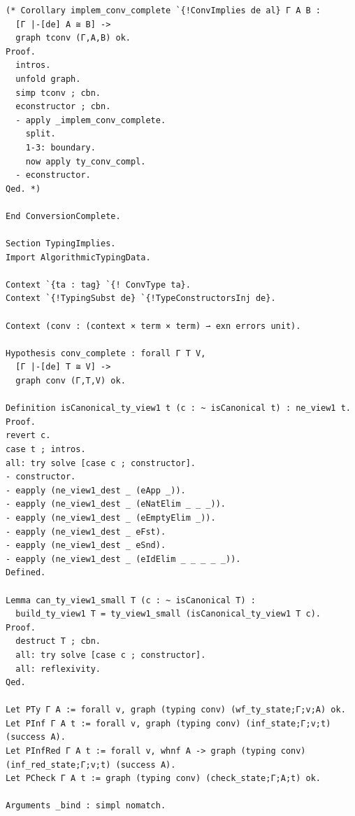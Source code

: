 \documentclass[10pt,a4paper]{amsart}
\begin{document}
\begin{lstlisting}
(* Corollary implem_conv_complete `{!ConvImplies de al} Γ A B :
  [Γ |-[de] A ≅ B] ->
  graph tconv (Γ,A,B) ok.
Proof.
  intros.
  unfold graph.
  simp tconv ; cbn.
  econstructor ; cbn.
  - apply _implem_conv_complete.
    split.
    1-3: boundary.
    now apply ty_conv_compl.
  - econstructor.
Qed. *)

End ConversionComplete.

Section TypingImplies.
Import AlgorithmicTypingData.

Context `{ta : tag} `{! ConvType ta}.
Context `{!TypingSubst de} `{!TypeConstructorsInj de}.

Context (conv : (context × term × term) ⇀ exn errors unit).

Hypothesis conv_complete : forall Γ T V,
  [Γ |-[de] T ≅ V] ->
  graph conv (Γ,T,V) ok.

Definition isCanonical_ty_view1 t (c : ~ isCanonical t) : ne_view1 t.
Proof.
revert c.
case t ; intros.
all: try solve [case c ; constructor].
- constructor.
- eapply (ne_view1_dest _ (eApp _)).
- eapply (ne_view1_dest _ (eNatElim _ _ _)).
- eapply (ne_view1_dest _ (eEmptyElim _)).
- eapply (ne_view1_dest _ eFst).
- eapply (ne_view1_dest _ eSnd).
- eapply (ne_view1_dest _ (eIdElim _ _ _ _ _)).
Defined.

Lemma can_ty_view1_small T (c : ~ isCanonical T) :
  build_ty_view1 T = ty_view1_small (isCanonical_ty_view1 T c).
Proof.
  destruct T ; cbn.
  all: try solve [case c ; constructor].
  all: reflexivity.
Qed.

Let PTy Γ A := forall v, graph (typing conv) (wf_ty_state;Γ;v;A) ok.
Let PInf Γ A t := forall v, graph (typing conv) (inf_state;Γ;v;t) (success A).
Let PInfRed Γ A t := forall v, whnf A -> graph (typing conv) (inf_red_state;Γ;v;t) (success A).
Let PCheck Γ A t := graph (typing conv) (check_state;Γ;A;t) ok.

Arguments _bind : simpl nomatch.


\end{lstlisting}
\end{document}
